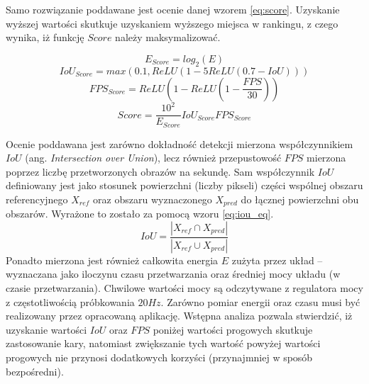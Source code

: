 Samo rozwiązanie poddawane jest ocenie danej wzorem \eqref{eq:score}. Uzyskanie wyższej wartości skutkuje uzyskaniem wyższego miejsca w rankingu, z czego wynika, iż funkcję $Score$ należy maksymalizować. 

\begin{equation}
E_{Score} = log_2(E)
\label{eq:e_score}
\end{equation}
\begin{equation}
IoU_{Score} = max(0.1, ReLU(1 - 5 ReLU(0.7 - IoU)))
\label{eq:iou_score}
\end{equation}
\begin{equation}
FPS_{Score} = ReLU(1 - ReLU( 1 - \frac{FPS}{30}))
\label{eq:fps_score}
\end{equation}
\begin{equation}
Score = \frac{10^2}{E_{Score}} IoU_{Score} FPS_{Score}
\label{eq:score}
\end{equation}

Ocenie poddawana jest zarówno dokładność detekcji mierzona współczynnikiem $IoU$ (ang. \emph{Intersection over Union}), lecz również przepustowość $FPS$ mierzona poprzez liczbę przetworzonych obrazów na sekundę.
Sam współczynnik $IoU$ definiowany jest jako stosunek powierzchni (liczby pikseli) części wspólnej obszaru referencyjnego $X_{ref}$ oraz obszaru wyznaczonego $X_{pred}$ do łącznej powierzchni obu obszarów. Wyrażone to zostało za pomocą wzoru \eqref{eq:iou_eq}.
\begin{equation}
IoU = \frac{|X_{ref} \cap X_{pred}|}{|X_{ref} \cup X_{pred}|}
\label{eq:iou_eq}
\end{equation}
Ponadto mierzona jest również całkowita energia $E$ zużyta przez układ -- wyznaczana jako iloczynu czasu przetwarzania oraz średniej mocy układu (w czasie przetwarzania). 
Chwilowe wartości mocy są odczytywane z regulatora mocy z częstotliwością próbkowania $20 Hz$.
Zarówno pomiar energii oraz czasu musi być realizowany przez opracowaną aplikację.
Wstępna analiza pozwala stwierdzić, iż uzyskanie wartości $IoU$ oraz $FPS$ poniżej wartości progowych skutkuje zastosowanie kary, natomiast
zwiększanie tych wartość powyżej wartości progowych nie przynosi dodatkowych korzyści (przynajmniej w sposób bezpośredni). 


